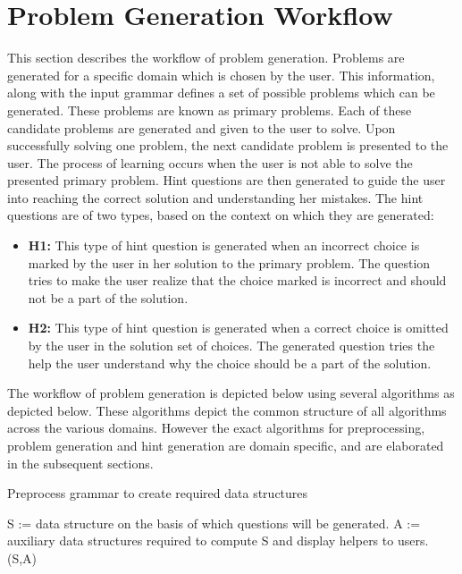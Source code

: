 \section{Problem Generation Workflow}
\label{sec:Problem Generation}
This section describes the workflow of problem generation. Problems are generated for a specific domain which is chosen by the user. This information, along with the input grammar defines a set of possible problems which can be generated. These problems are known as primary problems. Each of these candidate problems are generated and given to the user to solve. Upon successfully solving one problem, the next candidate problem is presented to the user. The process of learning occurs when the user is not able to solve the presented primary problem. Hint questions are then generated to guide the user into reaching the correct solution and understanding her mistakes. The hint questions are of two types, based on the context on which they are generated:
\begin{itemize}
\item \textbf{H1:} This type of hint question is generated when an incorrect choice is marked by the user in her solution to the primary problem. The question tries to make the user realize that the choice marked is incorrect and should not be a part of the solution.
\item \textbf{H2:} This type of hint question is generated when a correct choice is omitted by the user in the solution set of choices. The generated question tries the help the user understand why the choice should be a part of the solution.
\end{itemize}

The workflow of problem generation is depicted below using several algorithms as depicted below. These algorithms depict the common structure of all algorithms across the various domains. However the exact algorithms for preprocessing, problem generation and hint generation are domain specific, and are elaborated in the subsequent sections.

\begin{algorithm}
\caption{Preprocess grammar to create required data structures}
\label{algo:preprocess}
\begin{algorithmic}[1]
\State S := data structure on the basis of which questions will be generated.
\State A := auxiliary data structures required to compute S and display helpers to users.
\State \Return (S,A)
\EndFunction
\end{algorithmic}
\end{algorithm}

